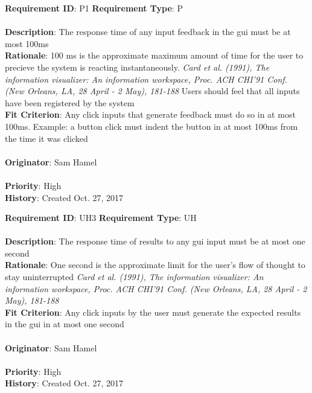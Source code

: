\documentclass[11pt]{article}
\begin{document}
\begin{framed}
	\noindent\textbf{Requirement ID}: P1 \hfill \textbf{Requirement Type}: P \hfill\\\\
	\noindent\textbf{Description}: The response time of any input feedback in the gui must be at most 100ms \\
	\textbf{Rationale}: 100 ms is the approximate maximum amount of time for the user to precieve the system is reacting instantaneously. 
    \textit{Card et al. (1991), The information visualizer: An information workspace, Proc. ACH CHI'91 Conf. (New Orleans, LA, 28 April - 2 May), 181-188} Users should feel that all inputs have been registered by the system\\
	\textbf{Fit Criterion}: Any click inputs that generate feedback must do so in at most 100ms. Example: a button click must indent the button in at most 100ms from the time it was clicked  \\\\
	\textbf{Originator}: Sam Hamel \\\\
	\textbf{Priority}: High \hfill \\
	\noindent\textbf{History}: Created Oct. 27, 2017
\end{framed}

\begin{framed}
	\noindent\textbf{Requirement ID}: UH3 \hfill \textbf{Requirement Type}: UH \hfill\\\\
	\noindent\textbf{Description}: The response time of results to any gui input must be at most one second \\
	\textbf{Rationale}: One second is the approximate limit for the user's flow of thought to stay uninterrupted
    \textit{Card et al. (1991), The information visualizer: An information workspace, Proc. ACH CHI'91 Conf. (New Orleans, LA, 28 April - 2 May), 181-188}\\
	\textbf{Fit Criterion}: Any click inputs by the user must generate the expected results in the gui in at most one second  \\\\
	\textbf{Originator}: Sam Hamel \\\\
	\textbf{Priority}: High \hfill \\
	\noindent\textbf{History}: Created Oct. 27, 2017
\end{framed}
\end{document}
